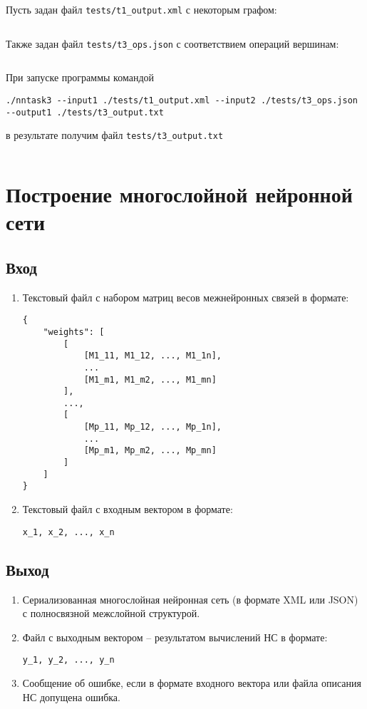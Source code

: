 \documentclass[spec, och, labwork]{SCWorks}
\begin{document}
Пусть задан файл \verb|tests/t1_output.xml| с некоторым графом:
\inputminted{xml}{../tests/t1_output.xml}

Также задан файл \verb|tests/t3_ops.json| с соответствием операций вершинам:
\inputminted{json}{../tests/t3_ops.json}

При запуске программы командой
\begin{verbatim}
./nntask3 --input1 ./tests/t1_output.xml --input2 ./tests/t3_ops.json --output1 ./tests/t3_output.txt
\end{verbatim}
в результате получим файл \verb|tests/t3_output.txt|
\inputminted{xml}{../tests/t3_output.txt}


\section{Построение многослойной нейронной сети}

\subsection*{Вход}

\begin{enumerate}
  \item
    Текстовый файл с набором матриц весов межнейронных связей в формате:
    \begin{verbatim}
{
    "weights": [
        [
            [M1_11, M1_12, ..., M1_1n],
            ...
            [M1_m1, M1_m2, ..., M1_mn]
        ],
        ...,
        [
            [Mp_11, Mp_12, ..., Mp_1n],
            ...
            [Mp_m1, Mp_m2, ..., Mp_mn]
        ]
    ]
}
    \end{verbatim}
  \item
    Текстовый файл с входным вектором в формате:
    \begin{verbatim}
x_1, x_2, ..., x_n
    \end{verbatim}
\end{enumerate}

\subsection*{Выход}

\begin{enumerate}
  \item
    Сериализованная многослойная нейронная сеть (в формате XML или JSON) с полносвязной межслойной структурой.
  \item
    Файл с выходным вектором – результатом вычислений НС в формате:
    \begin{verbatim}
y_1, y_2, ..., y_n
    \end{verbatim}
  \item
    Сообщение об ошибке, если в формате входного вектора или файла описания НС
    допущена ошибка.
\end{enumerate}
\end{document}
